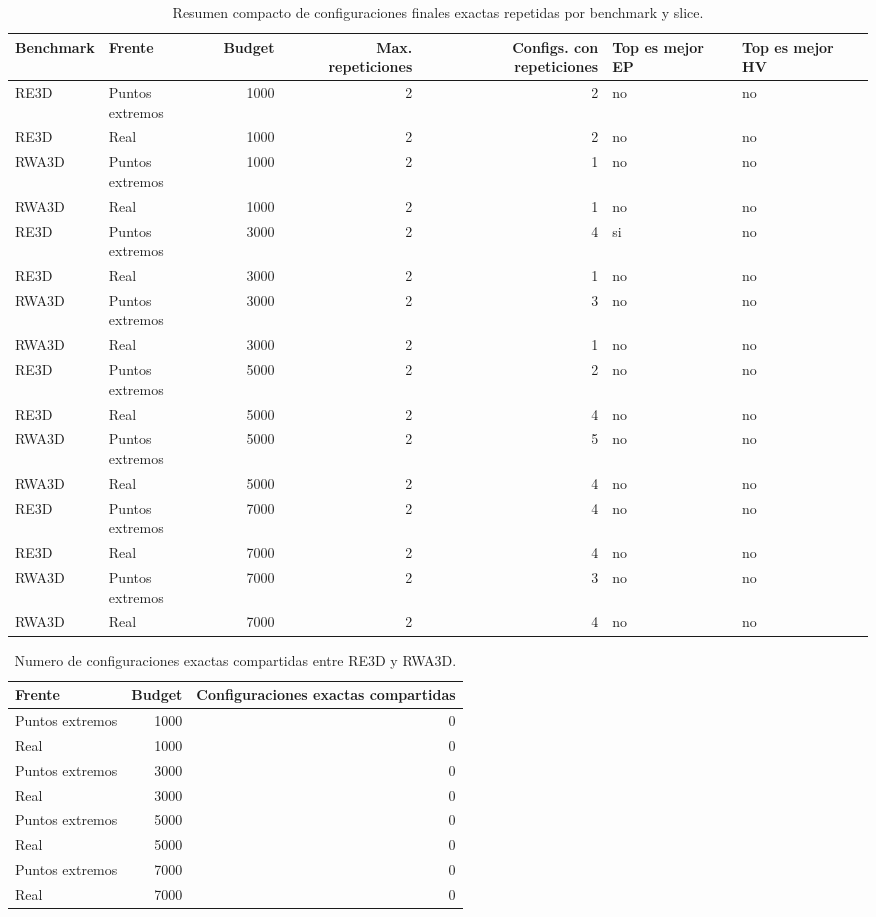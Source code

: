 \documentclass[11pt,a4paper]{article}
\begin{document}
{\scriptsize
\begin{table}[p]
\centering
\caption{Resumen compacto de configuraciones finales exactas repetidas por benchmark y slice.}
\label{tab:repeated_summary}
\begin{tabular}{llrrrll}
\toprule
Benchmark & Frente & Budget & Max. repeticiones & Configs. con repeticiones & Top es mejor EP & Top es mejor HV \\
\midrule
RE3D & Puntos extremos & 1000 & 2 & 2 & no & no \\
RE3D & Real & 1000 & 2 & 2 & no & no \\
RWA3D & Puntos extremos & 1000 & 2 & 1 & no & no \\
RWA3D & Real & 1000 & 2 & 1 & no & no \\
RE3D & Puntos extremos & 3000 & 2 & 4 & si & no \\
RE3D & Real & 3000 & 2 & 1 & no & no \\
RWA3D & Puntos extremos & 3000 & 2 & 3 & no & no \\
RWA3D & Real & 3000 & 2 & 1 & no & no \\
RE3D & Puntos extremos & 5000 & 2 & 2 & no & no \\
RE3D & Real & 5000 & 2 & 4 & no & no \\
RWA3D & Puntos extremos & 5000 & 2 & 5 & no & no \\
RWA3D & Real & 5000 & 2 & 4 & no & no \\
RE3D & Puntos extremos & 7000 & 2 & 4 & no & no \\
RE3D & Real & 7000 & 2 & 4 & no & no \\
RWA3D & Puntos extremos & 7000 & 2 & 3 & no & no \\
RWA3D & Real & 7000 & 2 & 4 & no & no \\
\bottomrule
\end{tabular}
\end{table}

}

{\scriptsize
\begin{table}[p]
\centering
\caption{Numero de configuraciones exactas compartidas entre RE3D y RWA3D.}
\label{tab:shared_exact}
\begin{tabular}{lrr}
\toprule
Frente & Budget & Configuraciones exactas compartidas \\
\midrule
Puntos extremos & 1000 & 0 \\
Real & 1000 & 0 \\
Puntos extremos & 3000 & 0 \\
Real & 3000 & 0 \\
Puntos extremos & 5000 & 0 \\
Real & 5000 & 0 \\
Puntos extremos & 7000 & 0 \\
Real & 7000 & 0 \\
\bottomrule
\end{tabular}
\end{table}

}
\end{document}
